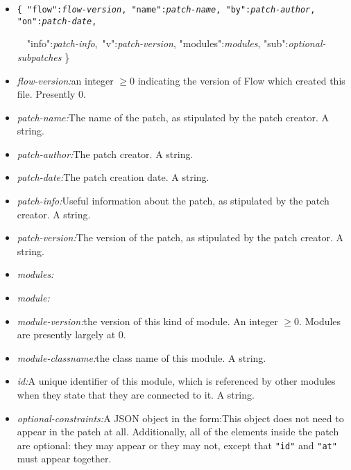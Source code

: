 \documentclass{article}
\begin{document}
\begin{itemize}
\item {\tt \{  "flow":{\it flow-version}, "name":{\it patch-name}, "by":{\it patch-author}, "on":{\it patch-date}, \rule[0in]{0in}{0in}~\hspace{\fill}\hbox{ "info":{\it patch-info}, "v":{\it patch-version},}  "modules":{\it modules}, "sub":{\it optional-subpatches} \} }
\item {\it flow-version:}\quad an integer \(\geq 0\) indicating the version of Flow which created this file.  Presently 0. 
\item {\it patch-name:}\quad The name of the patch, as stipulated by the patch creator.  A string. 
\item {\it patch-author:}\quad The patch creator.  A string.  
\item {\it patch-date:}\quad The patch creation date.  A string.  
\item {\it patch-info:}\quad Useful information about the patch, as stipulated by the patch creator.  A string.  
\item {\it patch-version:}\quad The version of the patch, as stipulated by the patch creator.  A string. 
\item {\it modules:}
\item {\it module:}
\item {\it module-version:}\quad the version of this kind of module.  An integer \(\geq 0\).  Modules are presently largely at 0.
\item {\it module-classname:}\quad the class name of this module.  A string.
\item {\it id:}\quad A unique identifier of this module, which is referenced by other modules when they state that they are connected to it.  A string.
\item {\it optional-constraints:}\quad A JSON object in the form:\quad  This object does not need to appear in the patch at all.  Additionally, all of the elements inside the patch are optional: they may appear or they may not, except that {\tt "id"} and {\tt "at"} must appear together.

\end{itemize}
\end{document}
